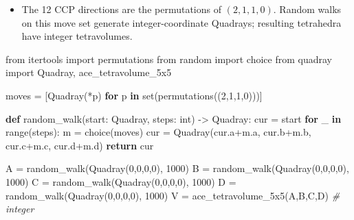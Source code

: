 \documentclass[
]{article}
\newenvironment{Shaded}{}{}
\newcommand{\BuiltInTok}[1]{#1}
\newcommand{\CommentTok}[1]{\textcolor[rgb]{0.38,0.63,0.69}{\textit{#1}}}
\newcommand{\ControlFlowTok}[1]{\textcolor[rgb]{0.00,0.44,0.13}{\textbf{#1}}}
\newcommand{\DecValTok}[1]{\textcolor[rgb]{0.25,0.63,0.44}{#1}}
\newcommand{\ImportTok}[1]{#1}
\newcommand{\KeywordTok}[1]{\textcolor[rgb]{0.00,0.44,0.13}{\textbf{#1}}}
\newcommand{\NormalTok}[1]{#1}
\newcommand{\OperatorTok}[1]{\textcolor[rgb]{0.40,0.40,0.40}{#1}}
\providecommand{\tightlist}{%
  \setlength{\itemsep}{0pt}\setlength{\parskip}{0pt}}
\begin{document}
\begin{itemize}
\tightlist
\item
  The 12 CCP directions are the permutations of \((2,1,1,0)\). Random
  walks on this move set generate integer-coordinate Quadrays; resulting
  tetrahedra have integer tetravolumes.
\end{itemize}

\begin{Shaded}
\begin{Highlighting}[]
\ImportTok{from}\NormalTok{ itertools }\ImportTok{import}\NormalTok{ permutations}
\ImportTok{from}\NormalTok{ random }\ImportTok{import}\NormalTok{ choice}
\ImportTok{from}\NormalTok{ quadray }\ImportTok{import}\NormalTok{ Quadray, ace\_tetravolume\_5x5}

\NormalTok{moves }\OperatorTok{=}\NormalTok{ [Quadray(}\OperatorTok{*}\NormalTok{p) }\ControlFlowTok{for}\NormalTok{ p }\KeywordTok{in} \BuiltInTok{set}\NormalTok{(permutations((}\DecValTok{2}\NormalTok{,}\DecValTok{1}\NormalTok{,}\DecValTok{1}\NormalTok{,}\DecValTok{0}\NormalTok{)))]}

\KeywordTok{def}\NormalTok{ random\_walk(start: Quadray, steps: }\BuiltInTok{int}\NormalTok{) }\OperatorTok{{-}\textgreater{}}\NormalTok{ Quadray:}
\NormalTok{    cur }\OperatorTok{=}\NormalTok{ start}
    \ControlFlowTok{for}\NormalTok{ \_ }\KeywordTok{in} \BuiltInTok{range}\NormalTok{(steps):}
\NormalTok{        m }\OperatorTok{=}\NormalTok{ choice(moves)}
\NormalTok{        cur }\OperatorTok{=}\NormalTok{ Quadray(cur.a}\OperatorTok{+}\NormalTok{m.a, cur.b}\OperatorTok{+}\NormalTok{m.b, cur.c}\OperatorTok{+}\NormalTok{m.c, cur.d}\OperatorTok{+}\NormalTok{m.d)}
    \ControlFlowTok{return}\NormalTok{ cur}

\NormalTok{A }\OperatorTok{=}\NormalTok{ random\_walk(Quadray(}\DecValTok{0}\NormalTok{,}\DecValTok{0}\NormalTok{,}\DecValTok{0}\NormalTok{,}\DecValTok{0}\NormalTok{), }\DecValTok{1000}\NormalTok{)}
\NormalTok{B }\OperatorTok{=}\NormalTok{ random\_walk(Quadray(}\DecValTok{0}\NormalTok{,}\DecValTok{0}\NormalTok{,}\DecValTok{0}\NormalTok{,}\DecValTok{0}\NormalTok{), }\DecValTok{1000}\NormalTok{)}
\NormalTok{C }\OperatorTok{=}\NormalTok{ random\_walk(Quadray(}\DecValTok{0}\NormalTok{,}\DecValTok{0}\NormalTok{,}\DecValTok{0}\NormalTok{,}\DecValTok{0}\NormalTok{), }\DecValTok{1000}\NormalTok{)}
\NormalTok{D }\OperatorTok{=}\NormalTok{ random\_walk(Quadray(}\DecValTok{0}\NormalTok{,}\DecValTok{0}\NormalTok{,}\DecValTok{0}\NormalTok{,}\DecValTok{0}\NormalTok{), }\DecValTok{1000}\NormalTok{)}
\NormalTok{V }\OperatorTok{=}\NormalTok{ ace\_tetravolume\_5x5(A,B,C,D)            }\CommentTok{\# integer}
\end{Highlighting}
\end{Shaded}
\end{document}
